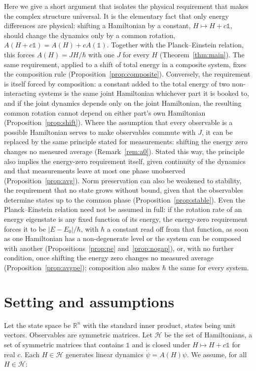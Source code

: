 \documentclass[11pt]{article}
\theoremstyle{remark}
\newcommand{\R}{\mathbb{R}}
\newcommand{\one}{\mathbb{1}}
\begin{document}
Here we give a short argument that isolates the physical requirement that makes the complex structure universal. It is the elementary fact that only energy differences are physical: shifting a Hamiltonian by a constant, $H\mapsto H+c\one$, should change the dynamics only by a common rotation, $A(H+c\one)=A(H)+cA(\one)$. Together with the Planck--Einstein relation, this forces $A(H)=JH/\hbar$ with one $J$ for every $H$ (Theorem~\ref{thm:main}). The same requirement, applied to a shift of total energy in a composite system, fixes the composition rule (Proposition~\ref{prop:composite}). Conversely, the requirement is itself forced by composition: a constant added to the total energy of two non-interacting systems is the same joint Hamiltonian whichever part it is booked to, and if the joint dynamics depends only on the joint Hamiltonian, the resulting common rotation cannot depend on either part's own Hamiltonian (Proposition~\ref{prop:shift}). Where the assumption that every observable is a possible Hamiltonian serves to make observables commute with $J$, it can be replaced by the same principle stated for measurements: shifting the energy zero changes no measured average (Remark~\ref{rem:a0}). Stated this way, the principle also implies the energy-zero requirement itself, given continuity of the dynamics and that measurements leave at most one phase unobserved (Proposition~\ref{prop:avg}). Norm preservation can also be weakened to stability, the requirement that no state grows without bound, given that the observables determine states up to the common phase (Proposition~\ref{prop:stable}). Even the Planck--Einstein relation need not be assumed in full: if the rotation rate of an energy eigenstate is any fixed function of its energy, the energy-zero requirement forces it to be $|E-E_0|/\hbar$, with $\hbar$ a constant read off from that function, as soon as one Hamiltonian has a non-degenerate level or the system can be composed with another (Propositions~\ref{prop:pe} and~\ref{prop:nogap}), or, with no further condition, once shifting the energy zero changes no measured average (Proposition~\ref{prop:avgpe}); composition also makes $\hbar$ the same for every system.

\section{Setting and assumptions}

Let the state space be $\R^n$ with the standard inner product, states being unit vectors. Observables are symmetric matrices. Let $\mathcal{H}$ be the set of Hamiltonians, a set of symmetric matrices that contains $\one$ and is closed under $H\mapsto H+c\one$ for real $c$. Each $H\in\mathcal{H}$ generates linear dynamics $\dot\psi = A(H)\psi$. We assume, for all $H\in\mathcal{H}$:
\end{document}
